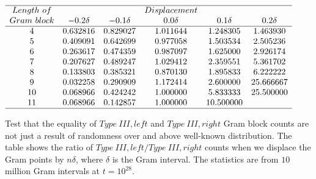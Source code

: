 \documentclass[twoside]{article}
\theoremstyle{definition}
\begin{document}
\begin{table}
\centering \(\begin{array}{cccccc}
\hline
Length~of 	& &&Displacement \\
Gram~block	& -0.2\delta & -0.1\delta & 0.0\delta & 0.1\delta & 0.2\delta  \\
\hline
4 &0.632816&0.829027&1.011644&1.248305&1.463930 \\
5 &0.409091&0.642699&0.977058&1.503534&2.505236 \\
6 &0.263617&0.474359&0.987097&1.625000&2.926174 \\
7 &0.207627&0.489247&1.029412&2.359551&5.361702 \\
8 &0.133803&0.385321&0.870130&1.895833&6.222222 \\
9 &0.032258&0.290909&1.172414&2.600000&25.666667 \\
10 &0.068966&0.424242&1.000000&5.833333&25.500000 \\
11 &0.068966&0.142857&1.000000&10.500000& \\
\hline
\end{array}\)
\caption{Test that the equality of  $Type~III,left$ and $Type~III,right$ Gram block counts are not just a result of randomness over and above well-known distribution. The table shows the ratio of $Type~III,left/Type~III,right$ counts when we displace the Gram points by $n\delta$, where $\delta$ is the Gram interval. The statistics are from $10$ million Gram intervals at $t=10^{28}$.} \label{tab:rosser3random}
\end{table}
\end{document}
